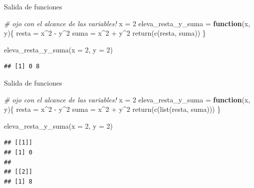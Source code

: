 \documentclass[
  ignorenonframetext,
]{beamer}
\newenvironment{Shaded}{\begin{snugshade}}{\end{snugshade}}
\newcommand{\AttributeTok}[1]{\textcolor[rgb]{0.77,0.63,0.00}{#1}}
\newcommand{\CommentTok}[1]{\textcolor[rgb]{0.56,0.35,0.01}{\textit{#1}}}
\newcommand{\ControlFlowTok}[1]{\textcolor[rgb]{0.13,0.29,0.53}{\textbf{#1}}}
\newcommand{\DecValTok}[1]{\textcolor[rgb]{0.00,0.00,0.81}{#1}}
\newcommand{\FunctionTok}[1]{\textcolor[rgb]{0.00,0.00,0.00}{#1}}
\newcommand{\NormalTok}[1]{#1}
\newcommand{\OtherTok}[1]{\textcolor[rgb]{0.56,0.35,0.01}{#1}}
\newcommand{\SpecialCharTok}[1]{\textcolor[rgb]{0.00,0.00,0.00}{#1}}
\begin{document}
\begin{frame}[fragile]{Salida de funciones}
\protect\hypertarget{salida-de-funciones}{}
\begin{Shaded}
\begin{Highlighting}[]
\CommentTok{\# ojo con el alcance de las variables!}
\NormalTok{x }\OtherTok{=} \DecValTok{2}
\NormalTok{eleva\_resta\_y\_suma }\OtherTok{=} \ControlFlowTok{function}\NormalTok{(x, y)\{}
\NormalTok{  resta }\OtherTok{=}\NormalTok{ x}\SpecialCharTok{\^{}}\DecValTok{2} \SpecialCharTok{{-}}\NormalTok{ y}\SpecialCharTok{\^{}}\DecValTok{2}
\NormalTok{  suma }\OtherTok{=}\NormalTok{ x}\SpecialCharTok{\^{}}\DecValTok{2} \SpecialCharTok{+}\NormalTok{ y}\SpecialCharTok{\^{}}\DecValTok{2}
  \FunctionTok{return}\NormalTok{(}\FunctionTok{c}\NormalTok{(resta, suma))}
\NormalTok{\}}

\FunctionTok{eleva\_resta\_y\_suma}\NormalTok{(}\AttributeTok{x =} \DecValTok{2}\NormalTok{, }\AttributeTok{y =} \DecValTok{2}\NormalTok{)}
\end{Highlighting}
\end{Shaded}

\begin{verbatim}
## [1] 0 8
\end{verbatim}
\end{frame}

\begin{frame}[fragile]{Salida de funciones}
\protect\hypertarget{salida-de-funciones-1}{}
\begin{Shaded}
\begin{Highlighting}[]
\CommentTok{\# ojo con el alcance de las variables!}
\NormalTok{x }\OtherTok{=} \DecValTok{2}
\NormalTok{eleva\_resta\_y\_suma }\OtherTok{=} \ControlFlowTok{function}\NormalTok{(x, y)\{}
\NormalTok{  resta }\OtherTok{=}\NormalTok{ x}\SpecialCharTok{\^{}}\DecValTok{2} \SpecialCharTok{{-}}\NormalTok{ y}\SpecialCharTok{\^{}}\DecValTok{2}
\NormalTok{  suma }\OtherTok{=}\NormalTok{ x}\SpecialCharTok{\^{}}\DecValTok{2} \SpecialCharTok{+}\NormalTok{ y}\SpecialCharTok{\^{}}\DecValTok{2}
  \FunctionTok{return}\NormalTok{(}\FunctionTok{c}\NormalTok{(}\FunctionTok{list}\NormalTok{(resta, suma)))}
\NormalTok{\}}

\FunctionTok{eleva\_resta\_y\_suma}\NormalTok{(}\AttributeTok{x =} \DecValTok{2}\NormalTok{, }\AttributeTok{y =} \DecValTok{2}\NormalTok{)}
\end{Highlighting}
\end{Shaded}

\begin{verbatim}
## [[1]]
## [1] 0
## 
## [[2]]
## [1] 8
\end{verbatim}
\end{frame}
\end{document}
